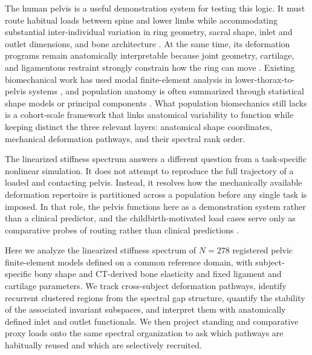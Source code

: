\documentclass[11pt]{article}
\begin{document}
The human pelvis is a useful demonstration system for testing this logic.
It must route habitual loads between spine and lower limbs while accommodating substantial inter-individual variation in ring geometry, sacral shape, inlet and outlet dimensions, and bone architecture \citep{Whitcome2017,Ruff2017,Betti2020,Weiss2020}.
At the same time, its deformation programs remain anatomically interpretable because joint geometry, cartilage, and ligamentous restraint strongly constrain how the ring can move \citep{Snijders1993,Vleeming2012,Goode2008,Meijer2014,Keizer2019,Noe2020}.
Existing biomechanical work has used modal finite-element analysis in lower-thorax-to-pelvis systems \citep{GuoTeo2005,Fan2021Modal}, and population anatomy is often summarized through statistical shape models or principal components \citep{Kriechling2022}.
What population biomechanics still lacks is a cohort-scale framework that links anatomical variability to function while keeping distinct the three relevant layers: anatomical shape coordinates, mechanical deformation pathways, and their spectral rank order.

The linearized stiffness spectrum answers a different question from a task-specific nonlinear simulation.
It does not attempt to reproduce the full trajectory of a loaded and contacting pelvis.
Instead, it resolves how the mechanically available deformation repertoire is partitioned across a population before any single task is imposed.
In that role, the pelvis functions here as a demonstration system rather than a clinical predictor, and the childbirth-motivated load cases serve only as comparative probes of routing rather than clinical predictions \citep{ChenGrimm2021,Almeida2024Uterus}.

Here we analyze the linearized stiffness spectrum of $N{=}278$ registered pelvic finite-element models defined on a common reference domain, with subject-specific bony shape and CT-derived bone elasticity and fixed ligament and cartilage parameters.
We track cross-subject deformation pathways, identify recurrent clustered regions from the spectral gap structure, quantify the stability of the associated invariant subspaces, and interpret them with anatomically defined inlet and outlet functionals.
We then project standing and comparative proxy loads onto the same spectral organization to ask which pathways are habitually reused and which are selectively recruited.
\end{document}
